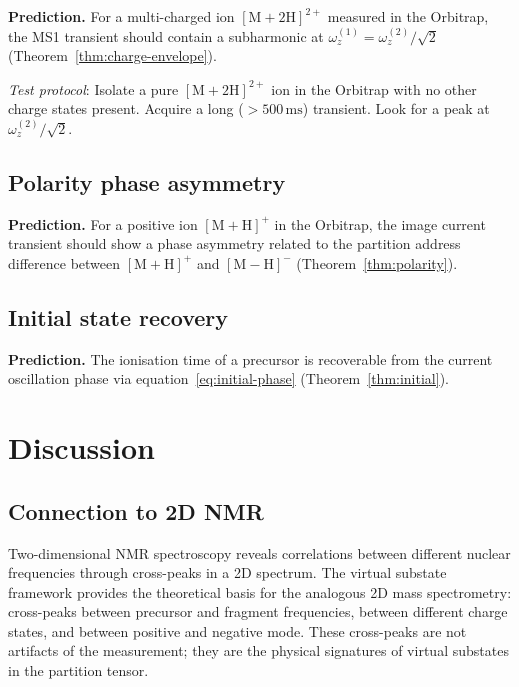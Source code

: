 \documentclass[twocolumn,10pt,a4paper]{article}
\theoremstyle{thmstyle}
\theoremstyle{definition}
\theoremstyle{remark}
\begin{document}
\textbf{Prediction.} For a multi-charged ion $[\mathrm{M+2H}]^{2+}$
measured in the Orbitrap, the MS1 transient should contain a subharmonic
at $\omega_z^{(1)} = \omega_z^{(2)}/\sqrt{2}$ (Theorem~\ref{thm:charge-envelope}).

\textit{Test protocol}: Isolate a pure $[\mathrm{M+2H}]^{2+}$ ion in
the Orbitrap with no other charge states present. Acquire a long
($>500\,\mathrm{ms}$) transient. Look for a peak at $\omega_z^{(2)}/\sqrt{2}$.

\subsection{Polarity phase asymmetry}

\textbf{Prediction.} For a positive ion $[\mathrm{M+H}]^+$ in the
Orbitrap, the image current transient should show a phase asymmetry
related to the partition address difference between $[\mathrm{M+H}]^+$
and $[\mathrm{M-H}]^-$ (Theorem~\ref{thm:polarity}).

\subsection{Initial state recovery}

\textbf{Prediction.} The ionisation time of a precursor is recoverable
from the current oscillation phase via equation~\eqref{eq:initial-phase}
(Theorem~\ref{thm:initial}).

\section{Discussion}
\label{sec:discussion}

\subsection{Connection to 2D NMR}

Two-dimensional NMR spectroscopy \citep{jeener1979,ernst1987} reveals
correlations between different nuclear frequencies through cross-peaks
in a 2D spectrum. The virtual substate framework provides the theoretical
basis for the analogous 2D mass spectrometry: cross-peaks between
precursor and fragment frequencies, between different charge states, and
between positive and negative mode. These cross-peaks are not artifacts
of the measurement; they are the physical signatures of virtual substates
in the partition tensor.
\end{document}
